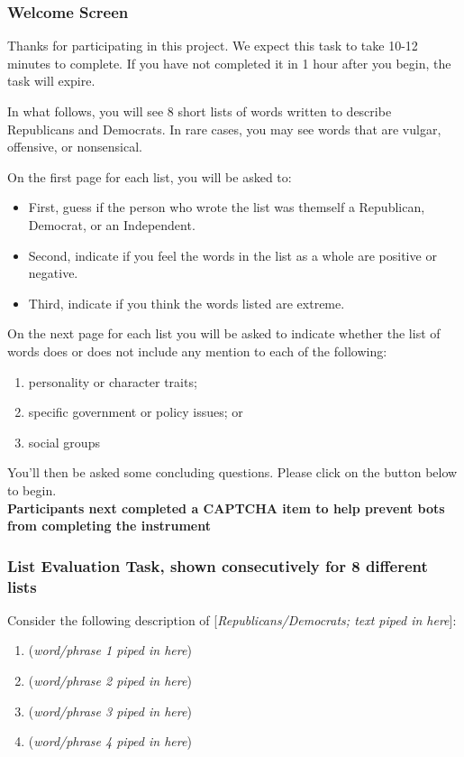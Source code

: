 \documentclass[11pt]{article}
\begin{document}
\subsubsection*{Welcome Screen}
Thanks for participating in this project. We expect this task to take 10-12 minutes to complete. If you have not completed it in 1 hour after you begin, the task will expire.

In what follows, you will see 8 short lists of words written to describe Republicans and Democrats. In rare cases, you may see words that are vulgar, offensive, or nonsensical.

On the first page for each list, you will be asked to:
\begin{itemize}
    \item First, guess if the person who wrote the list was themself a Republican, Democrat, or an Independent.
    \item Second, indicate if you feel the words in the list as a whole are positive or negative.
    \item Third, indicate if you think the words listed are extreme.
\end{itemize}

On the next page for each list you will be asked to indicate whether the list of words does or does not include any mention to each of the following:
\begin{enumerate}
\item personality or character traits;
\item specific government or policy issues; or
\item social groups
\end{enumerate}


You’ll then be asked some concluding questions. Please click on the button below to begin. \\

\noindent\textbf{Participants next completed a CAPTCHA item to help prevent bots from completing the instrument} \\

\subsubsection*{List Evaluation Task, shown consecutively for 8 different lists}
Consider the following description of [\textit{Republicans/Democrats; text piped in here}]:
\begin{enumerate}
    \item (\textit{word/phrase 1 piped in here})
    \item (\textit{word/phrase 2 piped in here})
    \item (\textit{word/phrase 3 piped in here})
    \item (\textit{word/phrase 4 piped in here})
\end{enumerate}
\end{document}
